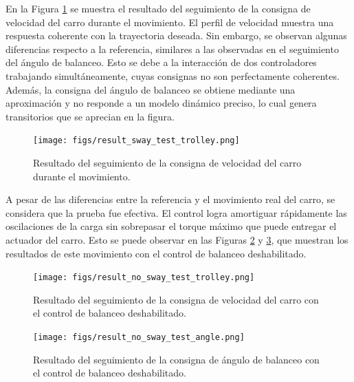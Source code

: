 \documentclass{article}
\begin{document}
            En la Figura \ref{fig:result_sway_test_trolley} se muestra el resultado del seguimiento de la consigna de velocidad del carro durante el movimiento. El perfil de velocidad muestra una respuesta coherente con la trayectoria deseada. Sin embargo, se observan algunas diferencias respecto a la referencia, similares a las observadas en el seguimiento del ángulo de balanceo. Esto se debe a la interacción de dos controladores trabajando simultáneamente, cuyas consignas no son perfectamente coherentes. Además, la consigna del ángulo de balanceo se obtiene mediante una aproximación y no responde a un modelo dinámico preciso, lo cual genera transitorios que se aprecian en la figura.

            \begin{figure} [H]
                \centering
                \texttt{[image: figs/result\_sway\_test\_trolley.png]}
                \caption{Resultado del seguimiento de la consigna de velocidad del carro durante el movimiento.}
                \label{fig:result_sway_test_trolley}
            \end{figure}

            A pesar de las diferencias entre la referencia y el movimiento real del carro, se considera que la prueba fue efectiva. El control logra amortiguar rápidamente las oscilaciones de la carga sin sobrepasar el torque máximo que puede entregar el actuador del carro. Esto se puede observar en las Figuras \ref{fig:result_no_sway_test_trolley} y \ref{fig:result_no_sway_test_angle}, que muestran los resultados de este movimiento con el control de balanceo deshabilitado.

            \begin{figure} [H]
                \centering
                \texttt{[image: figs/result\_no\_sway\_test\_trolley.png]}
                \caption{Resultado del seguimiento de la consigna de velocidad del carro con el control de balanceo deshabilitado.}
                \label{fig:result_no_sway_test_trolley}
            \end{figure}

            \begin{figure} [H]
                \centering
                \texttt{[image: figs/result\_no\_sway\_test\_angle.png]}
                \caption{Resultado del seguimiento de la consigna de ángulo de balanceo con el control de balanceo deshabilitado.}
                \label{fig:result_no_sway_test_angle}
            \end{figure}
\end{document}
